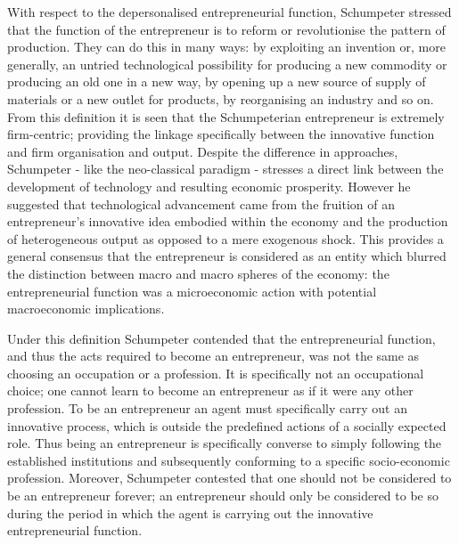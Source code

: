 With respect to the depersonalised entrepreneurial function, Schumpeter stressed that the function of the entrepreneur is to reform or revolutionise the pattern of production. They can do this in many ways: by exploiting an invention or, more generally, an untried technological possibility for producing a new commodity or producing an old one in a new way, by opening up a new source of supply of materials or a new outlet for products, by reorganising an industry and so on. From this definition it is seen that the Schumpeterian entrepreneur is extremely firm-centric; providing the linkage specifically between the innovative function and firm organisation and output. Despite the difference in approaches, Schumpeter - like the neo-classical paradigm - stresses a direct link between the development of technology and resulting economic prosperity. However he suggested that technological advancement came from the fruition of an entrepreneur's innovative idea embodied within the economy and the production of heterogeneous output as opposed to a mere exogenous shock. This provides a general consensus that the entrepreneur is considered as an entity which blurred the distinction between macro and macro spheres of the economy: the entrepreneurial function was a microeconomic action with potential macroeconomic implications.

Under this definition Schumpeter contended that the entrepreneurial function, and thus the acts required to become an entrepreneur, was not the same as choosing an occupation or a profession. It is specifically not an occupational choice; one cannot learn to become an entrepreneur as if it were any other profession. To be an entrepreneur an agent must specifically carry out an innovative process, which is outside the predefined actions of a socially expected role. Thus being an entrepreneur is specifically converse to simply following the established institutions and subsequently conforming to a specific socio-economic profession. Moreover, Schumpeter contested that one should not be considered to be an entrepreneur forever; an entrepreneur should only be considered to be so during the period in which the agent is carrying out the innovative entrepreneurial function.

